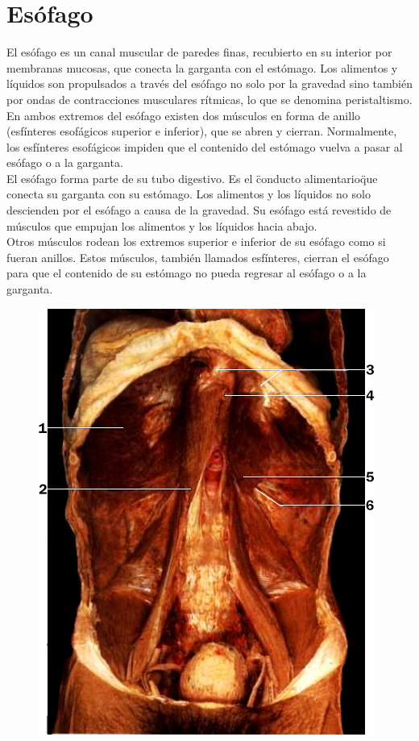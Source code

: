\section{Esófago}
El esófago es un canal muscular de paredes finas, recubierto en su interior por membranas mucosas, que conecta la garganta con el estómago. Los alimentos 
y líquidos son propulsados a través del esófago no solo por la gravedad sino también por ondas de contracciones musculares rítmicas, lo que se denomina peristaltismo. 
En ambos extremos del esófago existen dos músculos en forma de anillo (esfínteres esofágicos superior e inferior), que se abren y cierran. Normalmente, los esfínteres 
esofágicos impiden que el contenido del estómago vuelva a pasar al esófago o a la garganta.\\
El esófago forma parte de su tubo digestivo. Es el \"conducto alimentario\" que conecta su garganta con su estómago. Los alimentos y los líquidos no solo descienden por 
el esófago a causa de la gravedad. Su esófago está revestido de músculos que empujan los alimentos y los líquidos hacia abajo.\\
Otros músculos rodean los extremos superior e inferior de su esófago como si fueran anillos. Estos músculos, también llamados esfínteres, cierran el esófago para que 
el contenido de su estómago no pueda regresar al esófago o a la garganta.\\
\begin{figure}[H]
	\begin{center}
 		\includegraphics[width = .7\textwidth]{v2/images/image39.png}
	\end{center} 
\end{figure}
